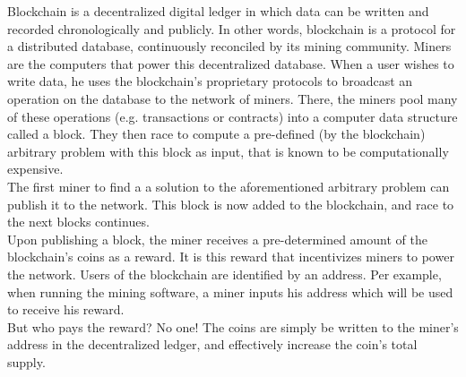 Blockchain is a decentralized digital ledger in which data can be written and recorded chronologically and publicly.
In other words, blockchain is a protocol for a distributed database, continuously reconciled by its mining community.
Miners are the computers that power this decentralized database.
When a user wishes to write data, he uses the blockchain's proprietary protocols to broadcast an operation on the database
to the network of miners.
There, the miners pool many of these operations (e.g. transactions or contracts) into a computer data structure called a block.
They then race to compute a pre-defined (by the blockchain) arbitrary problem with this block as input,
that is known to be computationally expensive.\\
The first miner to find a a solution to the aforementioned arbitrary problem can publish it to the network.
This block is now added to the blockchain, and race to the next blocks continues.\\
Upon publishing a block, the miner receives a pre-determined amount of the blockchain's coins as a reward.
It is this reward that incentivizes miners to power the network.
Users of the blockchain are identified by an address.
Per example, when running the mining software, a miner inputs his address which will be used to receive his reward.\\
But who pays the reward?
No one!
The coins are simply be written to the miner's address in the decentralized ledger, and effectively increase the coin's total supply.
